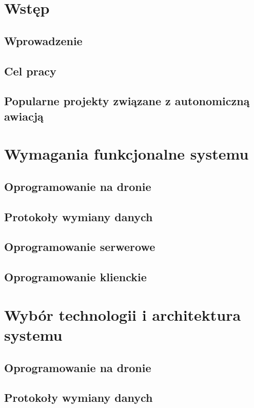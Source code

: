 \chapter{Wstęp}

\section{Wprowadzenie}
\section{Cel pracy}
\section{Popularne projekty związane z autonomiczną awiacją}


\chapter{Wymagania funkcjonalne systemu}

\section{Oprogramowanie na dronie}
\section{Protokoły wymiany danych}
\section{Oprogramowanie serwerowe}
\section{Oprogramowanie klienckie}


\chapter{Wybór technologii i architektura systemu}

\section{Oprogramowanie na dronie}
\section{Protokoły wymiany danych}
